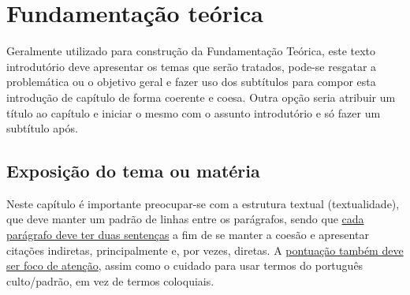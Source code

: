 \documentclass[
	12pt,				%
	oneside,			%
	a4paper,			%
	chapter=TITLE,		%
	section=TITLE,		%
	english,			%
	brazil,				%
	]{abntex2}
\begin{document}
\chapter{Fundamentação teórica} %

Geralmente utilizado para construção da Fundamentação Teórica, este texto introdutório deve apresentar os temas que serão tratados, pode-se resgatar a problemática ou o objetivo geral e fazer uso dos subtítulos para compor esta introdução de capítulo de forma coerente e coesa. Outra opção seria atribuir um título ao capítulo e iniciar o mesmo com o assunto introdutório e só fazer um subtítulo após.

\section{Exposição do tema ou matéria}

Neste capítulo é importante preocupar-se com a estrutura textual (textualidade), que deve manter um padrão de linhas entre os parágrafos, sendo que \href{https://www.youtube.com/watch?v=je0jo6D46w4}{cada parágrafo deve ter duas sentenças} a fim de se manter a coesão e apresentar citações indiretas, principalmente e, por vezes, diretas.
A \href{https://www.youtube.com/watch?v=hIn0_rbKoVw}{pontuação também deve ser foco de atenção}, assim como o cuidado para usar termos do português culto/padrão, em vez de termos coloquiais.
\end{document}

